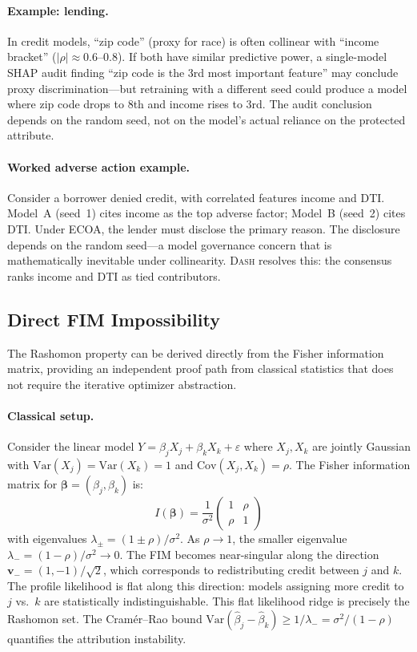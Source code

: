 \documentclass{jmlr}
\newcommand{\Var}{\mathrm{Var}}
\newcommand{\DASH}{\textsc{Dash}}
\begin{document}
\paragraph{Example: lending.}
In credit models, ``zip code'' (proxy for race) is often collinear with ``income bracket'' ($|\rho| \approx 0.6$--$0.8$). If both have similar predictive power, a single-model SHAP audit finding ``zip code is the 3rd most important feature'' may conclude proxy discrimination---but retraining with a different seed could produce a model where zip code drops to 8th and income rises to 3rd. The audit conclusion depends on the random seed, not on the model's actual reliance on the protected attribute.

\paragraph{Worked adverse action example.}
Consider a borrower denied credit, with correlated features income and DTI. Model~A (seed~1) cites income as the top adverse factor; Model~B (seed~2) cites DTI. Under ECOA, the lender must disclose the primary reason. The disclosure depends on the random seed---a model governance concern that is mathematically inevitable under collinearity. \DASH{} resolves this: the consensus ranks income and DTI as tied contributors.

\subsection{Direct FIM Impossibility}
\label{sec:fim}

The Rashomon property can be derived directly from the Fisher information matrix, providing an independent proof path from classical statistics that does not require the iterative optimizer abstraction.

\paragraph{Classical setup.}
Consider the linear model $Y = \beta_j X_j + \beta_k X_k + \varepsilon$ where $X_j, X_k$ are jointly Gaussian with $\Var(X_j) = \Var(X_k) = 1$ and $\text{Cov}(X_j, X_k) = \rho$. The Fisher information matrix for $\boldsymbol{\beta} = (\beta_j, \beta_k)$ is:
\[
    I(\boldsymbol{\beta}) = \frac{1}{\sigma^2}\begin{pmatrix} 1 & \rho \\ \rho & 1 \end{pmatrix}
\]
with eigenvalues $\lambda_\pm = (1 \pm \rho)/\sigma^2$. As $\rho \to 1$, the smaller eigenvalue $\lambda_- = (1-\rho)/\sigma^2 \to 0$. The FIM becomes near-singular along the direction $\boldsymbol{v}_- = (1, -1)/\sqrt{2}$, which corresponds to redistributing credit between $j$ and $k$. The profile likelihood is flat along this direction: models assigning more credit to $j$ vs.\ $k$ are statistically indistinguishable. This flat likelihood ridge is precisely the Rashomon set. The Cram\'er--Rao bound $\Var(\hat\beta_j - \hat\beta_k) \geq 1/\lambda_- = \sigma^2/(1-\rho)$ quantifies the attribution instability.
\end{document}
